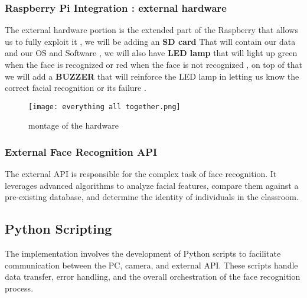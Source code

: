 \documentclass[11pt]{article}
\begin{document}
\subsubsection{Raspberry Pi Integration : external hardware }



\hspace{1cm} \hspace{1cm} The external hardware portion is the extended part of the Raspberry that allows us to fully exploit it , we will be adding an \textbf{SD card} That will contain our data and our OS and Software , we will also have \textbf{LED lamp} that will light up green when the face is recognized or red when the face is not recognized , on top of that we will add a \textbf{BUZZER } that will reinforce the LED lamp in letting us know the correct facial recognition or its failure .

\begin{figure}[h]
    \centering
    \texttt{[image: everything all together.png]}
    \caption{montage of the hardware }
    \label{fig:enter-label}
\end{figure}



    



	
	\hspace{1cm} \hspace{1cm} \subsubsection{External Face Recognition API}
	\hspace{1cm} \hspace{1cm} The external API is responsible for the complex task of face recognition. It leverages advanced algorithms to analyze facial features, compare them against a pre-existing database, and determine the identity of individuals in the classroom.
	
	\hspace{1cm} \subsection{Python Scripting}
	\hspace{1cm} The implementation involves the development of Python scripts to facilitate communication between the PC, camera, and external API. These scripts handle data transfer, error handling, and the overall orchestration of the face recognition process.
	
\end{document}
